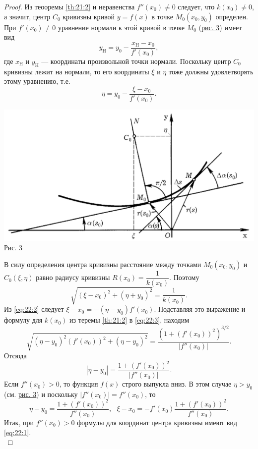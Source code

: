 \documentclass[12pt]{report}
\numberwithin{equation}{section}
\begin{document}
\begin{proof}
Из теооремы \ref{th:21:2} и неравенства $f''(x_0) \neq 0$ следует, что $k(x_0) \neq 0$, а значит, центр $C_0$ кривизны кривой $y = f(x)$ в точке $M_0(x_0,y_0)$ определен. При $f'(x_0) \neq 0$ уравнение нормали к этой кривой в точке $M_0$ (\hyperref[pic:22:1]{рис. 3}) имеет вид
\[ y_{\text{Н}} = y_0 - \frac{x_{\text{Н}} - x_0}{f'(x_0)}, \]
где $x_{\text{Н}}$ и $y_{\text{Н}}$ --- координаты произвольной точки нормали. Поскольку центр $C_0$ кривизны лежит на нормали, то его координаты $\xi$ и $\eta$ тоже должны удовлетворять этому уравнению, т.е.
\begin{equation} \label{eq:22:2}
\eta = y_0 - \frac{\xi - x_0}{f'(x_0)}.
\end{equation}

\begin{center}
\includegraphics[scale=0.3]{pic22_1.png} \label{pic:22:1}\\
Рис. 3
\end{center}
В силу определения центра кривизны расстояние между точками $M_0(x_0, y_0)$ и $C_0(\xi, \eta)$ равно радиусу кривизны $R(x_0) = \dfrac{1}{k(x_0)}$. Поэтому
\begin{equation} \label{eq:22:3}
\sqrt{(\xi - x_0)^2 + (\eta + y_0)^2} = \frac{1}{k(x_0)}.
\end{equation}
Из \eqref{eq:22:2} следует $\xi - x_0 = -(\eta - y_0) f'(x_0)$. Подставляя это выражение и формулу для $k(x_0)$ из теремы \ref{th:21:2} в \eqref{eq:22:3}, находим
\[ \sqrt{(\eta - y_0)^2 (f'(x_0))^2 + (\eta - y_0)^2} = \frac{\left( 1 + (f'(x_0))^2\right)^{3/2}}{|f''(x_0)|}.\]
Отсюда
\begin{equation} \label{eq:22:4}
|\eta - y_0| = \frac{1 + (f'(x_0))^2}{|f''(x_0)|}.
\end{equation}
Если $f''(x_0) > 0$, то функция $f(x)$ строго выпукла вниз. В этом случае $\eta > y_0$ (см. \hyperref[pic:22:1]{рис. 3}) и поскольку $|f''(x_0)| = f''(x_0)$, то
\[ \eta - y_0 = \frac{1 + (f'(x_0))^2}{f''(x_0)},~~~\xi - x_0 = -f'(x_0)\frac{1 + (f'(x_0))^2}{f''(x_0)}.\]
Итак, при $f''(x_0) > 0$ формулы для координат центра кривизны имеют вид \eqref{eq:22:1}.\\


\end{proof}
\end{document}
